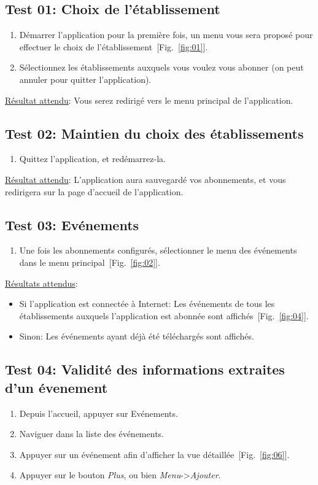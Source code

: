 \documentclass [pdftex,12pt] {report}
\begin{document}
  \subsection{Test 01: Choix de l'établissement}
    \begin{enumerate}
    \item Démarrer l'application pour la première fois, un menu vous sera proposé pour effectuer le choix de l'établissement~[Fig.~\ref{fig:01}].
    \item Sélectionnez les établissements auxquels vous voulez vous abonner (on peut annuler pour quitter l'application).
    \end{enumerate}

    \underline{Résultat attendu}: Vous serez redirigé vers le menu principal de l'application.

  \subsection{Test 02: Maintien du choix des établissements}
    \begin{enumerate}
    \item Quittez l'application, et redémarrez-la.
    \end{enumerate}

    \underline{Résultat attendu}: L'application aura sauvegardé vos abonnements, et vous redirigera sur la page d'accueil de l'application.

  \subsection{Test 03: Evénements}
    \begin{enumerate}
    \item Une fois les abonnements configurés, sélectionner le menu des événements dans le menu principal~[Fig.~\ref{fig:02}].
    \end{enumerate}

    \underline{Résultats attendus}:
    \begin{itemize}
    \item Si l'application est connectée à Internet: Les événements de tous les établissements auxquels l'application est abonnée sont affichés~[Fig.~\ref{fig:04}].
    \item Sinon: Les événements ayant déjà été téléchargés sont affichés.
    \end{itemize}

  \subsection{Test 04: Validité des informations extraites d'un évenement}
    \begin{enumerate}
    \item Depuis l'accueil, appuyer sur Evénements.
    \item Naviguer dans la liste des événements.
    \item Appuyer sur un événement afin d'afficher la vue détaillée~[Fig.~\ref{fig:06}].
    \item Appuyer sur le bouton \emph{Plus}, ou bien \emph{Menu}->\emph{Ajouter}.
    \end{enumerate}
\end{document}
